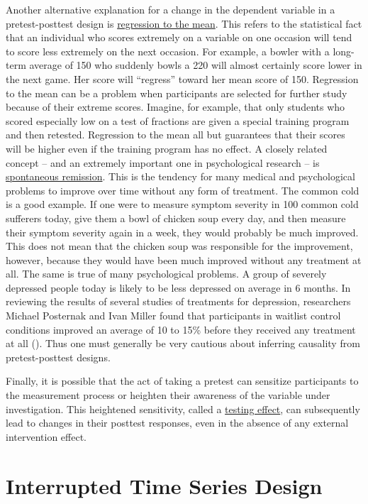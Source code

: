 \documentclass[
]{krantz}
\begin{document}
Another alternative explanation for a change in the dependent variable in a pretest-posttest design is \hyperref[regression-to-the-mean]{regression to the mean}. This refers to the statistical fact that an individual who scores extremely on a variable on one occasion will tend to score less extremely on the next occasion. For example, a bowler with a long-term average of 150 who suddenly bowls a 220 will almost certainly score lower in the next game. Her score will ``regress'' toward her mean score of 150. Regression to the mean can be a problem when participants are selected for further study because of their extreme scores. Imagine, for example, that only students who scored especially low on a test of fractions are given a special training program and then retested. Regression to the mean all but guarantees that their scores will be higher even if the training program has no effect. A closely related concept -- and an extremely important one in psychological research -- is \hyperref[spontaneous-remission]{spontaneous remission}. This is the tendency for many medical and psychological problems to improve over time without any form of treatment. The common cold is a good example. If one were to measure symptom severity in 100 common cold sufferers today, give them a bowl of chicken soup every day, and then measure their symptom severity again in a week, they would probably be much improved. This does not mean that the chicken soup was responsible for the improvement, however, because they would have been much improved without any treatment at all. The same is true of many psychological problems. A group of severely depressed people today is likely to be less depressed on average in 6 months. In reviewing the results of several studies of treatments for depression, researchers Michael Posternak and Ivan Miller found that participants in waitlist control conditions improved an average of 10 to 15\% before they received any treatment at all (). Thus one must generally be very cautious about inferring causality from pretest-posttest designs.

Finally, it is possible that the act of taking a pretest can sensitize participants to the measurement process or heighten their awareness of the variable under investigation. This heightened sensitivity, called a \hyperref[testing-effect]{testing effect}, can subsequently lead to changes in their posttest responses, even in the absence of any external intervention effect.

\section{Interrupted Time Series Design}\label{interrupted-time-series-design}
\end{document}
